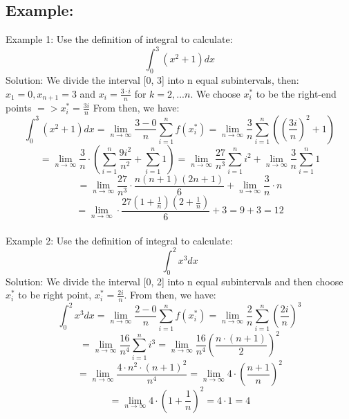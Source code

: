 \documentclass{article}
\begin{document}
\subsection{Example:}
Example 1: Use the definition of integral to calculate:
$$\int_{0}^{3} (x^2 + 1) dx$$
Solution:
We divide the interval [0, 3] into n equal subintervals, then:
$x_1 = 0, x_{n+1} = 3$ and $x_i =  \frac{3 \cdot i}{n}$ for $k = 2, . . . n.$
We choose $x^*_i$ to be the right-end points $=> x^*_i = \frac{3i}{n}$
From then, we have:
$$\int_{0}^{3} (x^2 + 1) dx = \lim_{n\to\infty} \frac{3-0}{n} \sum_{i=1}^{n} f(x^*_i) = \lim_{n\to\infty} \frac{3}{n} \sum_{i=1}^{n} ((\frac{3i}{n})^2+1)$$$$ = \lim_{n\to\infty} \frac{3}{n} \cdot \left(\sum_{i=1}^{n} \frac{9i^2}{n^2} + \sum_{i=1}^{n} 1 \right) = \lim_{n\to\infty} \frac{27}{n^3} \sum_{i=1}^{n} i^2 + \lim_{n\to\infty} \frac{3}{n} \sum_{i=1}^{n} 1$$ 
$$ = \lim_{n\to\infty} \frac{27}{n^3} \cdot \frac{n(n+1)(2n+1)}{6}+ \lim_{n\to\infty} \frac{3}{n} \cdot n$$
$$= \lim_{n\to\infty} \cdot \frac{27(1+\frac{1}{n})(2+\frac{1}{n})}{6} + 3 = 9 + 3 = 12$$
\\
Example 2: Use the definition of integral to calculate:
$$\int_{0}^{2} x^3 dx$$
Solution: We divide the interval [0, 2] into n equal subintervals and then choose $x^*_i$ to be right point, $x^*_i = \frac{2i}{n}$. From then, we have:
$$\int_{0}^{2} x^3 dx = \lim_{n\to\infty} \frac{2-0}{n} \sum_{i=1}^{n} f(x^*_i) = \lim_{n\to\infty} \frac{2}{n} \sum_{i=1}^{n} (\frac{2i}{n})^3$$
$$= \lim_{n\to\infty} \frac{16}{n^4} \sum_{i=1}^{n} i^3 = \lim_{n\to\infty} \frac{16}{n^4} \left(\frac{n\cdot(n+1)}{2}\right)^2$$
$$= \lim_{n\to\infty} \frac{4 \cdot n^2\cdot(n+1)^2}{n^4} = \lim_{n\to\infty} 4 \cdot \left(\frac{n+1}{n}\right)^2$$
$$= \lim_{n\to\infty} 4 \cdot \left(1+ \frac{1}{n}\right)^2 = 4 \cdot 1 = 4$$
\end{document}

